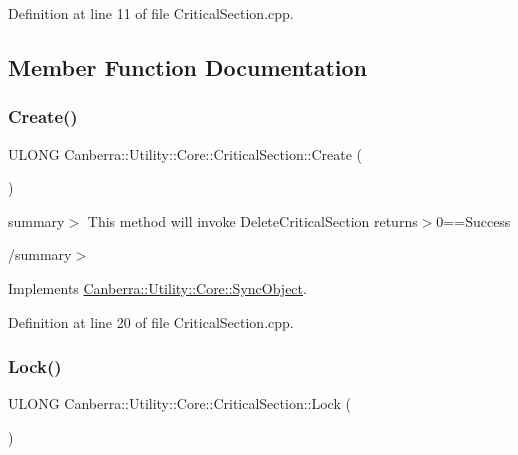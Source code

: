 Definition at line 11 of file Critical\+Section.\+cpp.



\subsection{Member Function Documentation}
\mbox{\label{class_canberra_1_1_utility_1_1_core_1_1_critical_section_a0331da73e6a8472e107813080b1ac107_a0331da73e6a8472e107813080b1ac107}} 
\subsubsection{\texorpdfstring{Create()}{Create()}}
{\footnotesize\ttfamily U\+L\+O\+NG Canberra\+::\+Utility\+::\+Core\+::\+Critical\+Section\+::\+Create (\begin{DoxyParamCaption}{ }\end{DoxyParamCaption})\hspace{0.3cm}{\ttfamily [virtual]}}

summary$>$ This method will invoke Delete\+Critical\+Section returns$>$0==Success

/summary$>$ 

Implements \hyperlink{class_canberra_1_1_utility_1_1_core_1_1_sync_object}{Canberra\+::\+Utility\+::\+Core\+::\+Sync\+Object}.



Definition at line 20 of file Critical\+Section.\+cpp.

\mbox{\label{class_canberra_1_1_utility_1_1_core_1_1_critical_section_ad6db25d94bb0c5b7f877c435c9fd9206_ad6db25d94bb0c5b7f877c435c9fd9206}} 
\subsubsection{\texorpdfstring{Lock()}{Lock()}}
{\footnotesize\ttfamily U\+L\+O\+NG Canberra\+::\+Utility\+::\+Core\+::\+Critical\+Section\+::\+Lock (\begin{DoxyParamCaption}{ }\end{DoxyParamCaption})\hspace{0.3cm}{\ttfamily [virtual]}}

